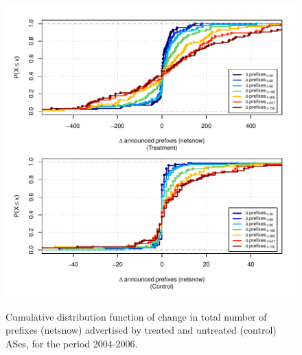 \clearpage
\vspace*{1.25em}
\begin{figure}[H]
\begin{centering}
\begin{singlespace}
\captionsetup{list=no}
    \includegraphics[width=6in]{figures/behavior-netsnow-2004_2006-corr.pdf}
    \vspace{-2em}\\
    \caption{Cumulative distribution function of change in total number of
    prefixes (netsnow) advertised by treated and untreated (control) ASes, for
    the period 2004-2006.}
\end{singlespace}
\end{centering}
\end{figure}

